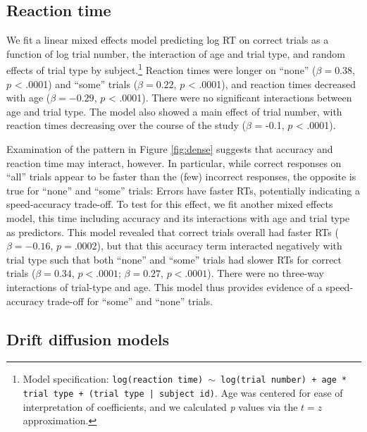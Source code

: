 \documentclass[10pt, letterpaper]{article}
\begin{document}
\subsection{Reaction time}\label{reaction-time}

We fit a linear mixed effects model predicting log RT on correct trials
as a function of log trial number, the interaction of age and trial
type, and random effects of trial type by subject.\footnote{Model
  specification:
  \texttt{log(reaction time) $\sim$ log(trial number) + age * trial type + (trial type | subject id)}.
  Age was centered for ease of interpretation of coefficients, and we
  calculated \emph{p} values via the \(t=z\) approximation.} Reaction
times were longer on ``none'' (\(\beta = 0.38\), \(p\) \textless{}
.0001) and ``some'' trials (\(\beta = 0.22\), \(p\) \textless{} .0001),
and reaction times decreased with age (\(\beta = -0.29\), \(p\)
\textless{} .0001). There were no significant interactions between age
and trial type. The model also showed a main effect of trial number,
with reaction times decreasing over the course of the study (\(\beta\) =
-0.1, \(p\) \textless{} .0001).

Examination of the pattern in Figure \ref{fig:dense} suggests that
accuracy and reaction time may interact, however. In particular, while
correct responses on ``all'' trials appear to be faster than the (few)
incorrect responses, the opposite is true for ``none'' and ``some''
trials: Errors have faster RTs, potentially indicating a speed-accuracy
trade-off. To test for this effect, we fit another mixed effects model,
this time including accuracy and its interactions with age and trial
type as predictors. This model revealed that correct trials overall had
faster RTs (\(\beta = -0.16\), \(p = .0002\)), but that this accuracy
term interacted negatively with trial type such that both ``none'' and
``some'' trials had slower RTs for correct trials (\(\beta = 0.34\),
\(p < .0001\); \(\beta = 0.27\), \(p < .0001\)). There were no three-way
interactions of trial-type and age. This model thus provides evidence of
a speed-accuracy trade-off for ``some'' and ``none'' trials.

\subsection{Drift diffusion models}\label{drift-diffusion-models}
\end{document}
